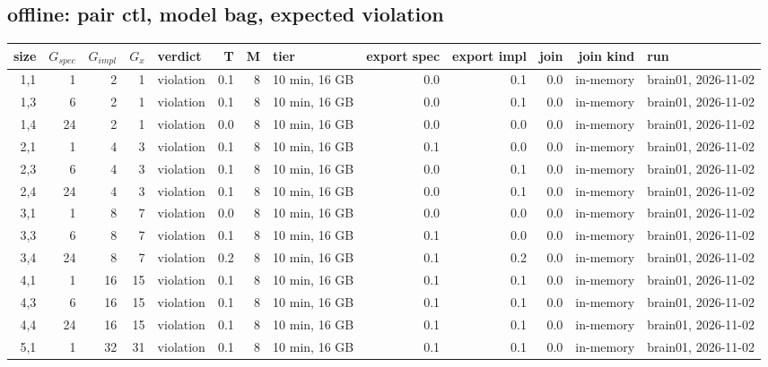 \documentclass[10pt]{article}
\begin{document}
\subsection*{offline: pair \textsf{ctl}, model bag, expected violation}
\begin{longtable}{@{}rrrrlrrlrrrrl@{}}
\toprule
size & $G_{\mathit{spec}}$ & $G_{\mathit{impl}}$ & $G_x$ & verdict & T & M & tier & export spec & export impl & join & join kind & run \\
\midrule
\endhead
\color{red} 1,1 & 1 & 2 & 1 & violation & 0.1 & 8 & 10 min, 16 GB & 0.0 & 0.1 & 0.0 & in-memory & brain01, 2026-11-02 \\
\color{red} 1,3 & 6 & 2 & 1 & violation & 0.1 & 8 & 10 min, 16 GB & 0.0 & 0.1 & 0.0 & in-memory & brain01, 2026-11-02 \\
\color{red} 1,4 & 24 & 2 & 1 & violation & 0.0 & 8 & 10 min, 16 GB & 0.0 & 0.0 & 0.0 & in-memory & brain01, 2026-11-02 \\
\color{red} 2,1 & 1 & 4 & 3 & violation & 0.1 & 8 & 10 min, 16 GB & 0.1 & 0.0 & 0.0 & in-memory & brain01, 2026-11-02 \\
\color{red} 2,3 & 6 & 4 & 3 & violation & 0.1 & 8 & 10 min, 16 GB & 0.0 & 0.1 & 0.0 & in-memory & brain01, 2026-11-02 \\
\color{red} 2,4 & 24 & 4 & 3 & violation & 0.1 & 8 & 10 min, 16 GB & 0.0 & 0.1 & 0.0 & in-memory & brain01, 2026-11-02 \\
\color{red} 3,1 & 1 & 8 & 7 & violation & 0.0 & 8 & 10 min, 16 GB & 0.0 & 0.0 & 0.0 & in-memory & brain01, 2026-11-02 \\
\color{red} 3,3 & 6 & 8 & 7 & violation & 0.1 & 8 & 10 min, 16 GB & 0.1 & 0.0 & 0.0 & in-memory & brain01, 2026-11-02 \\
\color{red} 3,4 & 24 & 8 & 7 & violation & 0.2 & 8 & 10 min, 16 GB & 0.1 & 0.2 & 0.0 & in-memory & brain01, 2026-11-02 \\
\color{red} 4,1 & 1 & 16 & 15 & violation & 0.1 & 8 & 10 min, 16 GB & 0.1 & 0.1 & 0.0 & in-memory & brain01, 2026-11-02 \\
\color{red} 4,3 & 6 & 16 & 15 & violation & 0.1 & 8 & 10 min, 16 GB & 0.1 & 0.1 & 0.0 & in-memory & brain01, 2026-11-02 \\
\color{red} 4,4 & 24 & 16 & 15 & violation & 0.1 & 8 & 10 min, 16 GB & 0.1 & 0.1 & 0.0 & in-memory & brain01, 2026-11-02 \\
\color{red} 5,1 & 1 & 32 & 31 & violation & 0.1 & 8 & 10 min, 16 GB & 0.1 & 0.1 & 0.0 & in-memory & brain01, 2026-11-02 \\

\end{longtable}
\end{document}
